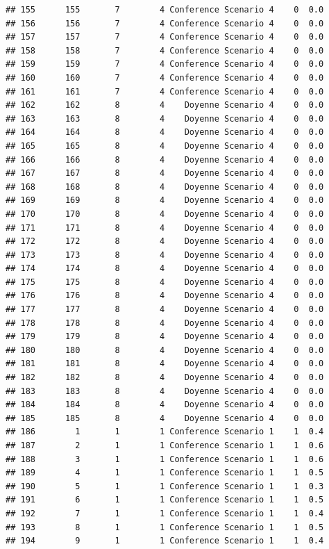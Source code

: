 \documentclass[
]{article}
\begin{document}
\begin{verbatim}
## 155      155       7        4 Conference Scenario 4    0  0.0
## 156      156       7        4 Conference Scenario 4    0  0.0
## 157      157       7        4 Conference Scenario 4    0  0.0
## 158      158       7        4 Conference Scenario 4    0  0.0
## 159      159       7        4 Conference Scenario 4    0  0.0
## 160      160       7        4 Conference Scenario 4    0  0.0
## 161      161       7        4 Conference Scenario 4    0  0.0
## 162      162       8        4    Doyenne Scenario 4    0  0.0
## 163      163       8        4    Doyenne Scenario 4    0  0.0
## 164      164       8        4    Doyenne Scenario 4    0  0.0
## 165      165       8        4    Doyenne Scenario 4    0  0.0
## 166      166       8        4    Doyenne Scenario 4    0  0.0
## 167      167       8        4    Doyenne Scenario 4    0  0.0
## 168      168       8        4    Doyenne Scenario 4    0  0.0
## 169      169       8        4    Doyenne Scenario 4    0  0.0
## 170      170       8        4    Doyenne Scenario 4    0  0.0
## 171      171       8        4    Doyenne Scenario 4    0  0.0
## 172      172       8        4    Doyenne Scenario 4    0  0.0
## 173      173       8        4    Doyenne Scenario 4    0  0.0
## 174      174       8        4    Doyenne Scenario 4    0  0.0
## 175      175       8        4    Doyenne Scenario 4    0  0.0
## 176      176       8        4    Doyenne Scenario 4    0  0.0
## 177      177       8        4    Doyenne Scenario 4    0  0.0
## 178      178       8        4    Doyenne Scenario 4    0  0.0
## 179      179       8        4    Doyenne Scenario 4    0  0.0
## 180      180       8        4    Doyenne Scenario 4    0  0.0
## 181      181       8        4    Doyenne Scenario 4    0  0.0
## 182      182       8        4    Doyenne Scenario 4    0  0.0
## 183      183       8        4    Doyenne Scenario 4    0  0.0
## 184      184       8        4    Doyenne Scenario 4    0  0.0
## 185      185       8        4    Doyenne Scenario 4    0  0.0
## 186        1       1        1 Conference Scenario 1    1  0.4
## 187        2       1        1 Conference Scenario 1    1  0.6
## 188        3       1        1 Conference Scenario 1    1  0.6
## 189        4       1        1 Conference Scenario 1    1  0.5
## 190        5       1        1 Conference Scenario 1    1  0.3
## 191        6       1        1 Conference Scenario 1    1  0.5
## 192        7       1        1 Conference Scenario 1    1  0.4
## 193        8       1        1 Conference Scenario 1    1  0.5
## 194        9       1        1 Conference Scenario 1    1  0.4

\end{verbatim}
\end{document}
